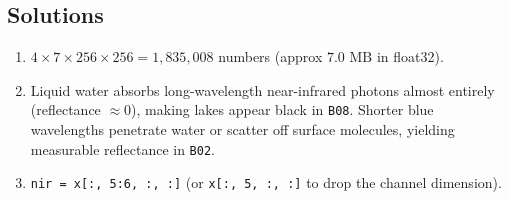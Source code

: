 \subsection*{Solutions}
\begin{enumerate}
    \item $4 \times 7 \times 256 \times 256 = 1{,}835{,}008$ numbers (approx $7.0\text{ MB}$ in float32).
    \item Liquid water absorbs long-wavelength near-infrared photons almost entirely (reflectance $\approx 0$), making lakes appear black in \texttt{B08}. Shorter blue wavelengths penetrate water or scatter off surface molecules, yielding measurable reflectance in \texttt{B02}.
    \item \texttt{nir = x[:, 5:6, :, :]} (or \texttt{x[:, 5, :, :]} to drop the channel dimension).
\end{enumerate}
